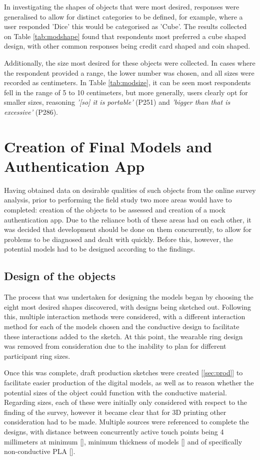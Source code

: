 \documentclass{l4proj}
\begin{document}
In investigating the shapes of objects that were most desired, responses were generalised to allow for distinct categories to be defined, for example, where a user responded 'Dice' this would be categorised as 'Cube'. The results collected on Table \ref{tab:modshape} found that respondents most preferred a cube shaped design, with other common responses being credit card shaped and coin shaped.

Additionally, the size most desired for these objects were collected. In cases where the respondent provided a range, the lower number was chosen, and all sizes were recorded as centimeters. In Table \ref{tab:modsize}, it can be seen most respondents fell in the range of 5 to 10 centimeters, but more generally, users clearly opt for smaller sizes, reasoning \textit{'[so] it is portable'} (P251) and \textit{'bigger than that is excessive'} (P286).

\section{Creation of Final Models and Authentication App}

Having obtained data on desirable qualities of such objects from the online survey analysis, prior to performing the field study two more areas would have to completed: creation of the objects to be assessed and creation of a mock authentication app. Due to the reliance both of these areas had on each other, it was decided that development should be done on them concurrently, to allow for problems to be diagnosed and dealt with quickly. Before this, however, the potential models had to be designed according to the findings.

\subsection{Design of the objects}

The process that was undertaken for designing the models began by choosing the eight most desired shapes discovered, with designs being sketched out. Following this, multiple interaction methods were considered, with a different interaction method for each of the models chosen and the conductive design to facilitate these interactions added to the sketch. At this point, the wearable ring design was removed from consideration due to the inability to plan for different participant ring sizes.

Once this was complete, draft production sketches were created [\ref{sec:prod}] to facilitate easier production of the digital models, as well as to reason whether the potential sizes of the object could function with the conductive material. Regarding sizes, each of these were initially only considered with respect to the finding of the survey, however it became clear that for 3D printing other consideration had to be made. Multiple sources were referenced to complete the designs, with distance between concurrently active touch points being 4 millimeters at minimum [\cite{schmitz2021itsy}], minimum thickness of models [\cite{3dwall}] and of specifically non-conductive PLA [\cite{schmitz2015capricate}].
\end{document}
